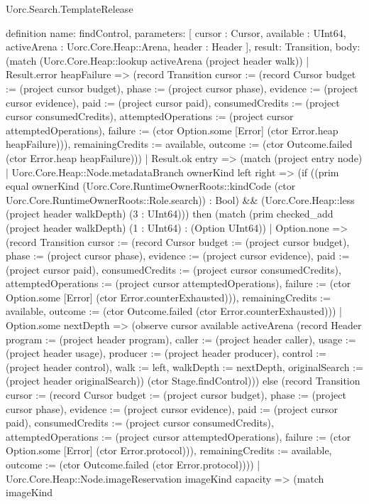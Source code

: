 \begin{lexlean}{Uorc.Search.TemplateRelease}
\begin{semanticmodule}
definition{
  name: findControl,
  parameters: [
    cursor : Cursor,
    available : UInt64,
    activeArena : Uorc.Core.Heap::Arena,
    header : Header
  ],
  result: Transition,
  body: (match (Uorc.Core.Heap::lookup activeArena (project header walk))
    | Result.error heapFailure => (record Transition {cursor := (record Cursor {budget := (project cursor budget), phase := (project cursor phase), evidence := (project cursor evidence), paid := (project cursor paid), consumedCredits := (project cursor consumedCredits), attemptedOperations := (project cursor attemptedOperations), failure := (ctor Option.some [Error] (ctor Error.heap heapFailure))}), remainingCredits := available, outcome := (ctor Outcome.failed (ctor Error.heap heapFailure))})
    | Result.ok entry => (match (project entry node)
      | Uorc.Core.Heap::Node.metadataBranch ownerKind left right => (if ((prim equal ownerKind (Uorc.Core.RuntimeOwnerRoots::kindCode (ctor Uorc.Core.RuntimeOwnerRoots::Role.search)) : Bool) && (Uorc.Core.Heap::less (project header walkDepth) (3 : UInt64))) then (match (prim checked_add (project header walkDepth) (1 : UInt64) : (Option UInt64))
        | Option.none => (record Transition {cursor := (record Cursor {budget := (project cursor budget), phase := (project cursor phase), evidence := (project cursor evidence), paid := (project cursor paid), consumedCredits := (project cursor consumedCredits), attemptedOperations := (project cursor attemptedOperations), failure := (ctor Option.some [Error] (ctor Error.counterExhausted))}), remainingCredits := available, outcome := (ctor Outcome.failed (ctor Error.counterExhausted))})
        | Option.some nextDepth => (observe cursor available activeArena (record Header {program := (project header program), caller := (project header caller), usage := (project header usage), producer := (project header producer), control := (project header control), walk := left, walkDepth := nextDepth, originalSearch := (project header originalSearch)}) (ctor Stage.findControl))) else (record Transition {cursor := (record Cursor {budget := (project cursor budget), phase := (project cursor phase), evidence := (project cursor evidence), paid := (project cursor paid), consumedCredits := (project cursor consumedCredits), attemptedOperations := (project cursor attemptedOperations), failure := (ctor Option.some [Error] (ctor Error.protocol))}), remainingCredits := available, outcome := (ctor Outcome.failed (ctor Error.protocol))}))
      | Uorc.Core.Heap::Node.imageReservation imageKind capacity => (match imageKind
}
\end{semanticmodule}
\end{lexlean}
